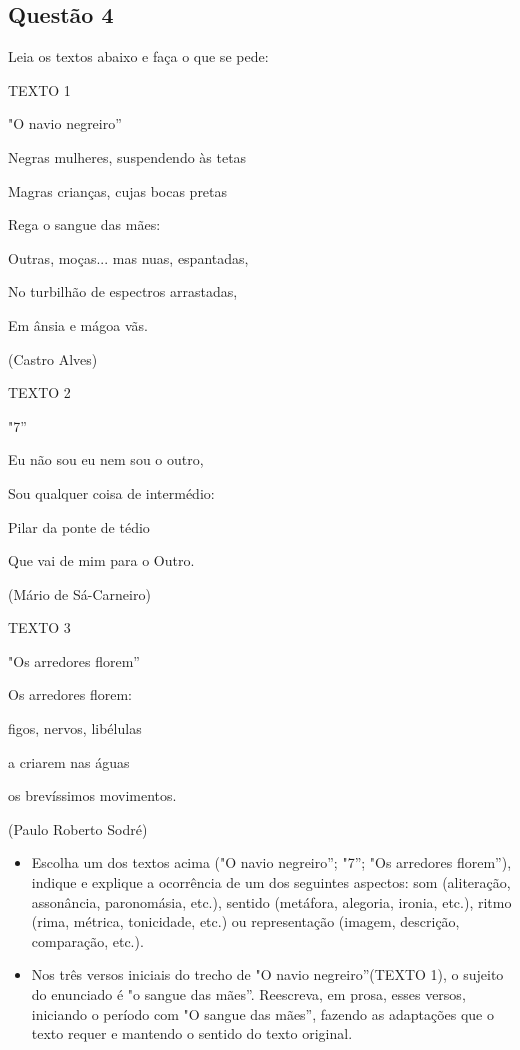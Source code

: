 \subsection{Questão 4}
Leia os textos abaixo e faça o que se pede:

TEXTO 1

"O navio negreiro''

Negras mulheres, suspendendo às tetas

Magras crianças, cujas bocas pretas

Rega o sangue das mães:

Outras, moças... mas nuas, espantadas,

No turbilhão de espectros arrastadas,

Em ânsia e mágoa vãs.

(Castro Alves)

TEXTO 2

"7''

Eu não sou eu nem sou o outro,

Sou qualquer coisa de intermédio:

Pilar da ponte de tédio

Que vai de mim para o Outro.

(Mário de Sá-Carneiro)

TEXTO 3

"Os arredores florem''

Os arredores florem:

figos, nervos, libélulas

a criarem nas águas

os brevíssimos movimentos.

(Paulo Roberto Sodré)

\begin{itemize}
\item Escolha um dos textos acima ("O navio negreiro''; "7''; "Os arredores florem''), indique e explique a ocorrência de um dos seguintes aspectos: som (aliteração, assonância, paronomásia, etc.), sentido (metáfora, alegoria, ironia, etc.), ritmo (rima, métrica, tonicidade, etc.) ou representação (imagem, descrição, comparação, etc.).
\item Nos três versos iniciais do trecho de "O navio negreiro''(TEXTO 1), o sujeito do enunciado é "o sangue das mães''. Reescreva, em prosa, esses versos, iniciando o período com "O sangue das mães'', fazendo as adaptações que o texto requer e mantendo o sentido do texto original.
\end{itemize}

